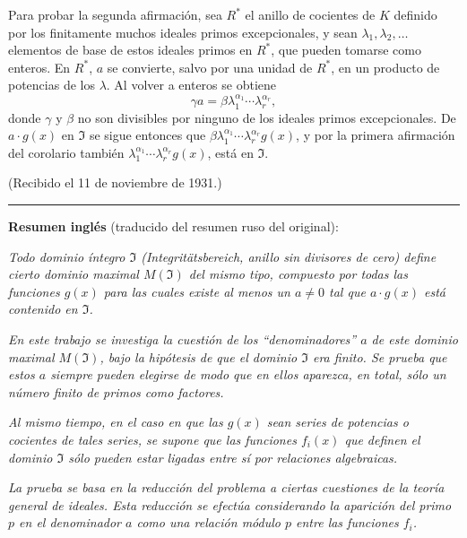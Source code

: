 Para probar la segunda afirmación, sea $R^*$ el anillo de cocientes de $K$ definido por los finitamente muchos ideales primos excepcionales, y sean $\lambda_1,\lambda_2,\ldots$ elementos de base de estos ideales primos en $R^*$, que pueden tomarse como enteros. En $R^*$, $a$ se convierte, salvo por una unidad de $R^*$, en un producto de potencias de los $\lambda$. Al volver a enteros se obtiene
\[
\gamma a=\beta\lambda_1^{\alpha_1}\cdots\lambda_r^{\alpha_r},
\]
donde $\gamma$ y $\beta$ no son divisibles por ninguno de los ideales primos excepcionales. De $a\cdot g(x)$ en $\mathfrak{I}$ se sigue entonces que $\beta\lambda_1^{\alpha_1}\cdots\lambda_r^{\alpha_r}g(x)$, y por la primera afirmación del corolario también $\lambda_1^{\alpha_1}\cdots\lambda_r^{\alpha_r}g(x)$, está en $\mathfrak{I}$.

\begin{center}
(Recibido el 11 de noviembre de 1931.)
\end{center}

\bigskip
\noindent\rule{\textwidth}{0.4pt}
\medskip
\noindent\textbf{Resumen inglés} (traducido del resumen ruso del original):

\smallskip
\emph{Todo dominio íntegro $\mathfrak{I}$ (Integritätsbereich, anillo sin divisores de cero) define cierto dominio maximal $M(\mathfrak{I})$ del mismo tipo, compuesto por todas las funciones $g(x)$ para las cuales existe al menos un $a\ne0$ tal que $a\cdot g(x)$ está contenido en $\mathfrak{I}$.}

\emph{En este trabajo se investiga la cuestión de los ``denominadores'' $a$ de este dominio maximal $M(\mathfrak{I})$, bajo la hipótesis de que el dominio $\mathfrak{I}$ era finito. Se prueba que estos $a$ siempre pueden elegirse de modo que en ellos aparezca, en total, sólo un número finito de primos como factores.}

\emph{Al mismo tiempo, en el caso en que las $g(x)$ sean series de potencias o cocientes de tales series, se supone que las funciones $f_i(x)$ que definen el dominio $\mathfrak{I}$ sólo pueden estar ligadas entre sí por relaciones algebraicas.}

\emph{La prueba se basa en la reducción del problema a ciertas cuestiones de la teoría general de ideales. Esta reducción se efectúa considerando la aparición del primo $p$ en el denominador $a$ como una relación módulo $p$ entre las funciones $f_i$.}
